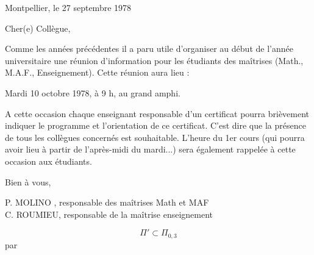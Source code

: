 Montpellier, le 27 septembre 1978

Cher(e) Collègue,

Comme les années précédentes il a paru utile d'organiser au début de l'année universitaire une réunion d'information pour les étudiants des maîtrises (Math., M.A.F., Enseignement). Cette réunion aura lieu :

\begin{center}
Mardi 10 octobre 1978, à 9 h, au grand amphi.
\end{center}

A cette occasion chaque enseignant responsable d'un certificat pourra brièvement indiquer le programme et l'orientation de ce certificat. C'est dire que la présence de tous les collègues concernés est souhaitable. L'heure du 1er cours (qui pourra avoir lieu à partir de l'après-midi du mardi...) sera également rappelée à cette occasion aux étudiants.

Bien à vous,

\begin{flushright}
P. MOLINO , responsable des maîtrises Math et MAF\\
C. ROUMIEU, responsable de la maîtrise enseignement
\end{flushright}


\[
\Pi'\subset\Pi_{0,3}
\]
 par




